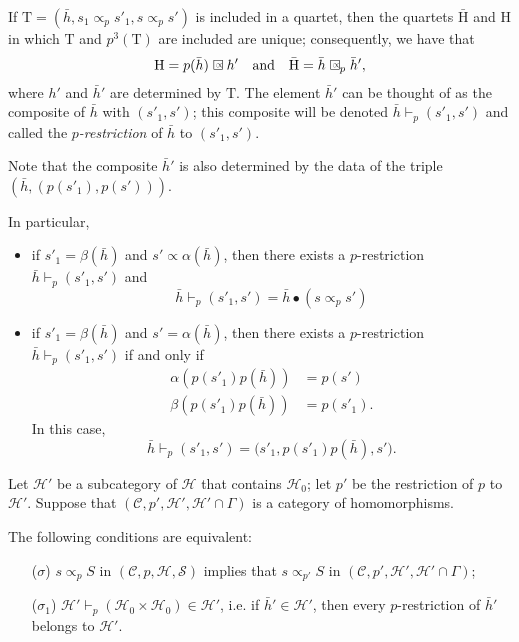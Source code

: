 \documentclass[a4paper,fleqn]{article}
\theoremstyle{plain}
\newenvironment{proposition}[1]
  {\renewcommand\theinnerproposition{#1}\innerproposition}
  {\endinnerproposition}
\theoremstyle{definition}
\newcommand{\oldpage}[1]{{\marginpar{\footnotesize$\bigg\vert$\,\,\,\,\textit{p.~#1}}}}
\newcommand{\textand}{\quad\text{and}\quad}
\newcommand{\CC}{\mathcal{C}}
\newcommand{\HH}{\mathcal{H}}
\newcommand{\rHH}{\mathrm{H}}
\renewcommand{\SS}{\mathcal{S}}
\newcommand{\subs}{\mathrel{\propto}}
\newcommand{\sqsubs}{\mathrel{\mathrlap{\square}\raisebox{.17em}{\scaleobj{0.65}{\,\,\propto}}}}
\begin{document}
If $\mathrm{T}=(\bar{h},s_1\subs_p s'_1,s\subs_p s')$ is included in a quartet, then the quartets $\bar{\rHH}$ and $\rHH$ in which $\mathrm{T}$ and $p^3(\mathrm{T})$ are included are unique;
consequently, we have that
\[
  \rHH = p(\bar{h})\sqsubs h'
  \textand
  \bar{\rHH} = \bar{h}\sqsubs_p \bar{h}',
\]
\oldpage{367}
where $h'$ and $\bar{h}'$ are determined by $\mathrm{T}$.
The element $\bar{h}'$ can be thought of as the composite of $\bar{h}$ with $(s'_1,s')$;
this composite will be denoted $\bar{h}\vdash_p(s'_1,s')$ and called the \emph{$p$-restriction} of $\bar{h}$ to $(s'_1,s')$.

Note that the composite $\bar{h}'$ is also determined by the data of the triple $(\bar{h},(p(s'_1),p(s')))$.

In particular,

\begin{itemize}
  \item if $s'_1=\beta(\bar{h})$ and $s'\subs\alpha(\bar{h})$, then there exists a $p$-restriction $\bar{h}\vdash_p(s'_1,s')$ and
    \[
      \bar{h}\vdash_p(s'_1,s')
      = \bar{h}\bullet(s\subs_p s')
    \]
  \item if $s'_1=\beta(\bar{h})$ and $s'=\alpha(\bar{h})$, then there exists a $p$-restriction $\bar{h}\vdash_p(s'_1,s')$ if and only if
    \[
      \begin{aligned}
        \alpha(p(s'_1)p(\bar{h}))
        &= p(s')
      \\\beta(p(s'_1)p(\bar{h}))
        &= p(s'_1).
      \end{aligned}
    \]
    In this case,
    \[
      \bar{h}\vdash_p(s'_1,s')
      = \big(
        s'_1, p(s'_1)p(\bar{h}), s'
      \big).
    \]
\end{itemize}

Let $\HH'$ be a subcategory of $\HH$ that contains $\HH_0$;
let $p'$ be the restriction of $p$ to $\HH'$.
Suppose that $(\CC,p',\HH',\HH'\cap\Gamma)$ is a category of homomorphisms.

\begin{proposition}{10}
\label{proposition:i-10}
  The following conditions are equivalent:

  \begin{enumerate}
    \item[\normalfont($\sigma$)] $s\subs_p S$ in $(\CC,p,\HH,\SS)$ implies that $s\subs_{p'}S$ in $(\CC,p',\HH',\HH'\cap\Gamma)$;

    \item[\normalfont($\sigma_1$)] $\HH'\vdash_p(\HH_0\times\HH_0)\in\HH'$, i.e. if $\bar{h}'\in\HH'$, then every $p$-restriction of $\bar{h}'$ belongs to $\HH'$.
  \end{enumerate}
\end{proposition}
\end{document}
